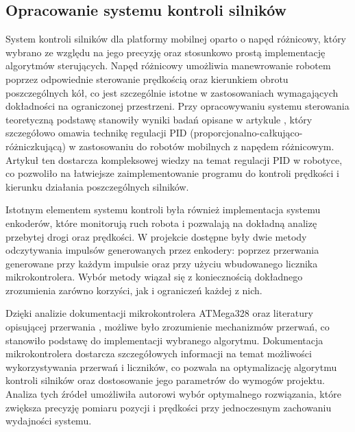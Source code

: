 \subsection{Opracowanie systemu kontroli silników}

System kontroli silników dla platformy mobilnej oparto o napęd różnicowy, który wybrano ze względu na jego precyzję oraz stosunkowo prostą implementację algorytmów sterujących. Napęd różnicowy umożliwia manewrowanie robotem poprzez odpowiednie sterowanie prędkością oraz kierunkiem obrotu poszczególnych kół, co jest szczególnie istotne w zastosowaniach wymagających dokładności na ograniczonej przestrzeni. Przy opracowywaniu systemu sterowania teoretyczną podstawę stanowiły wyniki badań opisane w artykule \cite{bib:konferencja}, który szczegółowo omawia technikę regulacji PID (proporcjonalno-całkująco-różniczkującą) w zastosowaniu do robotów mobilnych z napędem różnicowym. Artykuł ten dostarcza kompleksowej wiedzy na temat regulacji PID w robotyce, co pozwoliło na łatwiejsze zaimplementowanie programu do kontroli prędkości i kierunku działania poszczególnych silników. 

Istotnym elementem systemu kontroli była również implementacja systemu enkoderów, które monitorują ruch robota i pozwalają na dokładną analizę przebytej drogi oraz prędkości. W projekcie dostępne były dwie metody odczytywania impulsów generowanych przez enkodery: poprzez przerwania generowane przy każdym impulsie oraz przy użyciu wbudowanego licznika mikrokontrolera. Wybór metody wiązał się z koniecznością dokładnego zrozumienia zarówno korzyści, jak i ograniczeń każdej z nich.

Dzięki analizie dokumentacji mikrokontrolera ATMega328 \cite{bib:manualarduino} oraz literatury opisującej przerwania \cite{bib:artykul1}, możliwe było zrozumienie mechanizmów przerwań, co stanowiło podstawę do implementacji wybranego algorytmu. Dokumentacja mikrokontrolera dostarcza szczegółowych informacji na temat możliwości wykorzystywania przerwań i liczników, co pozwala na optymalizację algorytmu kontroli silników oraz dostosowanie jego parametrów do wymogów projektu. Analiza tych źródeł umożliwiła autorowi wybór optymalnego rozwiązania, które zwiększa precyzję pomiaru pozycji i prędkości przy jednoczesnym zachowaniu wydajności systemu.
